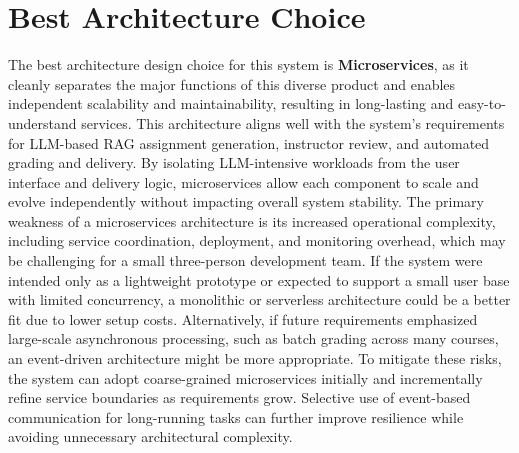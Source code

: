 \documentclass[12pt]{article}
\begin{document}
\section{Best Architecture Choice}

The best architecture design choice for this system is \textbf{Microservices}, as it cleanly separates the major functions of this diverse product and enables independent scalability and maintainability, resulting in long-lasting and easy-to-understand services. This architecture aligns well with the system’s requirements for LLM-based RAG assignment generation, instructor review, and automated grading and delivery. By isolating LLM-intensive workloads from the user interface and delivery logic, microservices allow each component to scale and evolve independently without impacting overall system stability.
The primary weakness of a microservices architecture is its increased operational complexity, including service coordination, deployment, and monitoring overhead, which may be challenging for a small three-person development team. If the system were intended only as a lightweight prototype or expected to support a small user base with limited concurrency, a monolithic or serverless architecture could be a better fit due to lower setup costs. Alternatively, if future requirements emphasized large-scale asynchronous processing, such as batch grading across many courses, an event-driven architecture might be more appropriate.
To mitigate these risks, the system can adopt coarse-grained microservices initially and incrementally refine service boundaries as requirements grow. Selective use of event-based communication for long-running tasks can further improve resilience while avoiding unnecessary architectural complexity.
\end{document}
